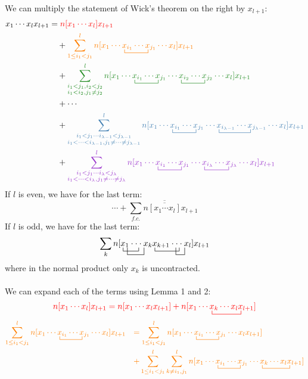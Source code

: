 \documentclass{article}
\newcommand{\ol}{\overline}
\newcommand{\ctr}{\bcontraction}
\newcommand{\cd}{\ensuremath{\cdots} }
\def\cb#1{{\color{blue}#1}}
\def\co#1{{\color{orange}#1}}
\def\cre#1{{\color{red}#1}}
\def\cg#1{{\color{green}#1}}
\def\cp#1{{\color{purple}#1}}
\begin{document}
We can multiply the statement of Wick's theorem on the right by $x_{l+1}$:
\begin{align*}
x_1 \cd x_l x_{l + 1} 
&= \cre{n[x_1 \cd x_l ] x_{l + 1} } \\
& \quad +  \co{\sum_{1 \leq i_1 <  j_1}^l n[x_1 \cd \ctr{}{x}{{}_{i_1}\cd}{x} x_{i_1}  \cd x_{j_1}  \cd x_l ] x_{l + 1} } \\
& \quad +  \cg{ \sum_{\substack{i_1 < j_1,  i_2 < j_2 \\ i_1 < i_2, j_1 \neq j_2}}^l
n[x_1 \cd \ctr{}{x}{{}_{i_1}\cd}{x} x_{i_1}  \cd x_{j_1} \cd \ctr{}{x}{{}_{i_2}\cd}{x} x_{i_2}  \cd x_{j_2} \cd x_l ] x_{l + 1} } \\
 & \quad  +  \cd \\
& \quad + \cb{ \sum_{\substack{i_1 <  j_1 \cd  i_{\lambda - 1} < j_{\lambda - 1} \\ i_1 < \cd < i_{\lambda - 1}, j_1 \neq \cd \neq j_{\lambda-1}}}^l
n[x_1 \cd \ctr{}{x}{{}_{i_1}\cd}{x} x_{i_1}  \cd x_{j_1} \cd \ctr{}{x}{{}_{i_{\lambda -1} }\cd}{x} x_{i_{\lambda-1}}  \cd x_{j_{\lambda - 1}} \cd x_l ] x_{l + 1} } \\
& \quad + \cp{ \sum_{\substack{i_1 <  j_1 \cd  i_\lambda < j_\lambda \\ i_1 < \cd < i_\lambda, j_1 \neq \cd \neq j_\lambda}}^l
n[x_1 \cd \ctr{}{x}{{}_{i_1}\cd}{x} x_{i_1}  \cd x_{j_1} \cd \ctr{}{x}{{}_{i_\lambda}\cd}{x} x_{i_\lambda}  \cd x_{j_\lambda} \cd x_l ] x_{l + 1} } \\
\end{align*}
If $l$ is even, we have for the last term: 
\[ \cd + \sum_{f.c.} n\ol{\ol{[x_1\cd x_l]}}x_{l+1} \]
If $l$ is odd, we have for the last term: 
\[\sum_{k} n[  
\ctr{}{x}{{}_1 \cdot}{\cdot}
\ctr[2ex]{x}{{}_1 }{\cdot \cdot\cdot}{}
x_1 \cdot \cdot \cdot  x_k 
\ctr{}{x}{{}_{k+1} \cdot}{\cdot}{ {}}
\ctr[2ex]{x_{k + 1}  \cdot}{}{\cdot}{x}
x_{k + 1}  \cdot \cdot \cdot  x_l] x_{l+1} \]
where in the normal product only $x_k$ is uncontracted.\\ \\
We can expand each of the terms using Lemma 1 and 2: 
\begin{align*}
\cre{n[x_1 \cd x_l ] x_{l + 1} = n[x_1 \cd x_l  x_{l + 1} ] + n[x_1 \cd \ctr{}{x}{{}_k \cd x_l }{x} x_k \cd x_l  x_{l + 1} ]
} 
\end{align*}
\begin{align*}
\co{\sum_{1 \leq i_1 <  j_1}^l n[x_1 \cd \ctr{}{x}{{}_{i_1}\cd}{x} x_{i_1}  \cd x_{j_1}  \cd x_l ] x_{l + 1} } 
& \quad \co{ = \sum_{1 \leq i_1 <  j_1}^l n[x_1 \cd \ctr{}{x}{{}_{i_1}\cd}{x} x_{i_1}  \cd x_{j_1}  \cd x_l x_{l + 1}]  }\\
& \quad \co{ + \sum_{1 \leq i_1 <  j_1}^l \sum_{k \neq i_1, j_1}^l n[x_1 \cd \ctr{}{x}{{}_{i_1}\cd}{x} x_{i_1}  \cd x_{j_1}  \cd \ctr{}{x}{{}_k \cd  x_l}{x} x_k \cd  x_l x_{l + 1}]  }
\end{align*}
\end{document}

